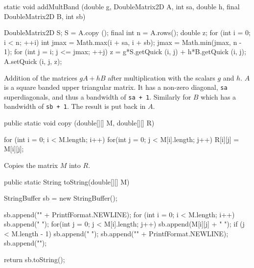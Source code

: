 \begin{hide}
\begin{code}
   static void addMultBand (double g, DoubleMatrix2D A, int sa,
                            double h, final DoubleMatrix2D B, int sb) \begin{hide} {
      DoubleMatrix2D S;
      S = A.copy ();
      final int n = A.rows();
      double z;
      for (int i = 0; i < n; ++i) {
         int jmax = Math.max(i + sa, i + sb);
         jmax = Math.min(jmax, n - 1);
         for (int j = i; j <= jmax; ++j) {
            z = g*S.getQuick (i, j) + h*B.getQuick (i, j);
            A.setQuick (i, j, z);
         }
      }
   } \end{hide}
\end{code}
\begin{tabb} Addition of the matrices $gA + hB$ after multiplication with
the scalars $g$ and $h$. $A$ is a square banded upper triangular matrix.
It has a non-zero diagonal, \texttt{sa} superdiagonals, and thus a bandwidth
of \texttt{sa + 1}. Similarly for $B$ which has a bandwidth of \texttt{sb + 1}.
The result is put back in $A$.
\end{tabb}
\begin{htmlonly}
\end{htmlonly}
 \end{hide}
\begin{code}

   public static void copy (double[][] M, double[][] R) \begin{hide} {
       for (int i = 0; i < M.length; i++) {
         for(int j = 0; j < M[i].length; j++) {
            R[i][j] = M[i][j];
         }
      }
   } \end{hide}
\end{code}
\begin{tabb} Copies the matrix $M$ into $R$.
\end{tabb}
\begin{htmlonly}
\end{htmlonly}
\begin{code}

   public static String toString(double[][] M) \begin{hide} {
      StringBuffer sb = new StringBuffer();

      sb.append("{" + PrintfFormat.NEWLINE);
      for (int i = 0; i < M.length; i++) {
         sb.append("   { ");
         for(int j = 0; j < M[i].length; j++) {
            sb.append(M[i][j] + " ");
            if (j < M.length - 1)
               sb.append(" ");
         }
         sb.append("}" + PrintfFormat.NEWLINE);
      }
      sb.append("}");

      return sb.toString();
   } \end{hide}
\end{code}
